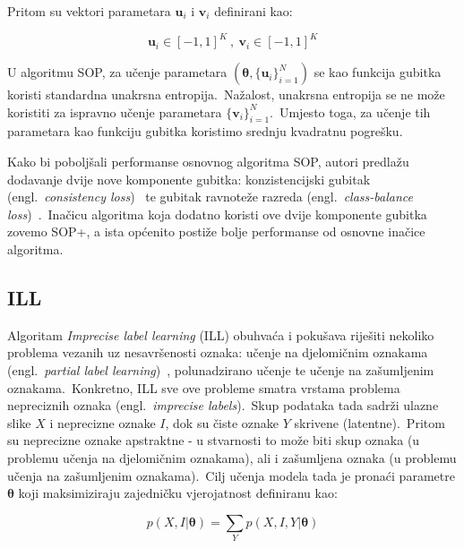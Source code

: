 \documentclass[diplomskirad]{fer}
\begin{document}
Pritom su vektori parametara $\bm{u}_i$ i $\bm{v}_i$ definirani kao:

\begin{equation}
  \bm{u}_i \in \left[ -1, 1 \right]^K\:,\:\bm{v}_i \in \left[ -1, 1 \right]^K
  \label{eq:sop_u,i}
\end{equation}

U algoritmu SOP, za učenje parametara $(\bm{\theta}, \{\bm{u}_i\}_{i=1}^N)$ se kao funkcija gubitka koristi standardna unakrsna entropija.\ Nažalost, unakrsna entropija se ne može koristiti za ispravno učenje parametara $\{\bm{v}_i\}_{i=1}^N$.\ 
Umjesto toga, za učenje tih parametara kao funkciju gubitka koristimo srednju kvadratnu pogrešku.\ 

Kako bi poboljšali performanse osnovnog algoritma SOP, autori predlažu dodavanje dvije nove komponente gubitka: konzistencijski gubitak (engl.\ \textit{consistency loss})~\cite{berthelot2019mixmatch} te gubitak ravnoteže razreda (engl.\ \textit{class-balance loss})~\cite{tanaka2018joint}.\ 
Inačicu algoritma koja dodatno koristi ove dvije komponente gubitka zovemo SOP+, a ista općenito postiže bolje performanse od osnovne inačice algoritma.\

\pagebreak

\subsection{ILL}
\label{sub:ill}

Algoritam \textit{Imprecise label learning} (ILL) obuhvaća i pokušava riješiti nekoliko problema vezanih uz nesavršenosti oznaka: učenje na djelomičnim oznakama (engl.\ \textit{partial label learning})~\cite{tian2023partial}, polunadzirano učenje te učenje na zašumljenim oznakama.\ 
Konkretno, ILL sve ove probleme smatra vrstama problema nepreciznih oznaka (engl.\ \textit{imprecise labels}).\ Skup podataka tada sadrži ulazne slike $X$ i neprecizne oznake $I$, dok su čiste oznake $Y$ skrivene (latentne).\ 
Pritom su neprecizne oznake apstraktne - u stvarnosti to može biti skup oznaka (u problemu učenja na djelomičnim oznakama), ali i zašumljena oznaka (u problemu učenja na zašumljenim oznakama).\ 
Cilj učenja modela tada je pronaći parametre $\bm{\theta}$ koji maksimiziraju zajedničku vjerojatnost definiranu kao: 

\begin{equation}
  p(X, I | \bm{\theta}) = \sum_{Y} p(X, I, Y | \bm{\theta})
  \label{eq:ill_joint}
\end{equation}
\end{document}
